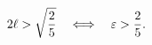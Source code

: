 \begin{equation}
\label{eq:epsilonmin}
2 \ell > \sqrt{2\over 5} \quad \Longleftrightarrow \quad \varepsilon >
\frac{2}{5}.
\end{equation}

